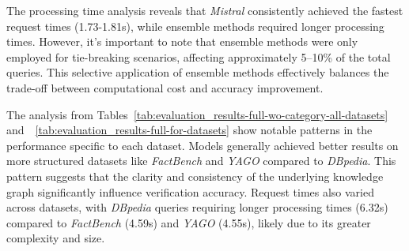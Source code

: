 The processing time analysis reveals that \textit{Mistral} consistently achieved the fastest request times (1.73-1.81s), while ensemble methods required longer processing times.
However, it's important to note that ensemble methods were only employed for tie-breaking scenarios, affecting approximately 5--10\% of the total queries.
This selective application of ensemble methods effectively balances the trade-off between computational cost and accuracy improvement.

\begin{table}[ht!]
    \noindent
    \centering
    \caption{Statistical analysis of request time per query across FactBench, YAGO, and DBpedia datasets.}
    \label{tab:evaluation_results-full-for-datasets}
\end{table}

The analysis from Tables~\ref{tab:evaluation_results-full-wo-category-all-datasets} and~~\ref{tab:evaluation_results-full-for-datasets} show notable patterns in the performance specific to each dataset.
Models generally achieved better results on more structured datasets like \textit{FactBench} and \textit{YAGO} compared to \textit{DBpedia}.
This pattern suggests that the clarity and consistency of the underlying knowledge graph significantly influence verification accuracy.
Request times also varied across datasets, with \textit{DBpedia} queries requiring longer processing times (6.32s) compared to \textit{FactBench} (4.59s) and \textit{YAGO} (4.55s), likely due to its greater complexity and size.

